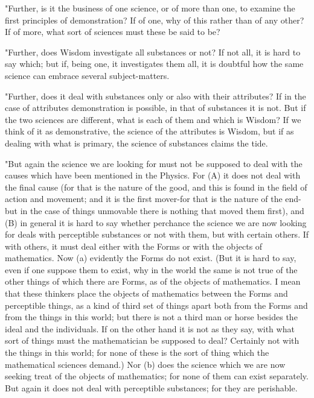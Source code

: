 "Further, is it the business of one science, or of more than one,
to examine the first principles of demonstration? If of one, why of
this rather than of any other? If of more, what sort of sciences must
these be said to be? 

"Further, does Wisdom investigate all substances or not? If not all,
it is hard to say which; but if, being one, it investigates them all,
it is doubtful how the same science can embrace several subject-matters.

"Further, does it deal with substances only or also with their attributes?
If in the case of attributes demonstration is possible, in that of
substances it is not. But if the two sciences are different, what
is each of them and which is Wisdom? If we think of it as demonstrative,
the science of the attributes is Wisdom, but if as dealing with what
is primary, the science of substances claims the tide. 

"But again the science we are looking for must not be supposed to
deal with the causes which have been mentioned in the Physics. For
(A) it does not deal with the final cause (for that is the nature
of the good, and this is found in the field of action and movement;
and it is the first mover-for that is the nature of the end-but in
the case of things unmovable there is nothing that moved them first),
and (B) in general it is hard to say whether perchance the science
we are now looking for deals with perceptible substances or not with
them, but with certain others. If with others, it must deal either
with the Forms or with the objects of mathematics. Now (a) evidently
the Forms do not exist. (But it is hard to say, even if one suppose
them to exist, why in the world the same is not true of the other
things of which there are Forms, as of the objects of mathematics.
I mean that these thinkers place the objects of mathematics between
the Forms and perceptible things, as a kind of third set of things
apart both from the Forms and from the things in this world; but there
is not a third man or horse besides the ideal and the individuals.
If on the other hand it is not as they say, with what sort of things
must the mathematician be supposed to deal? Certainly not with the
things in this world; for none of these is the sort of thing which
the mathematical sciences demand.) Nor (b) does the science which
we are now seeking treat of the objects of mathematics; for none of
them can exist separately. But again it does not deal with perceptible
substances; for they are perishable. 

